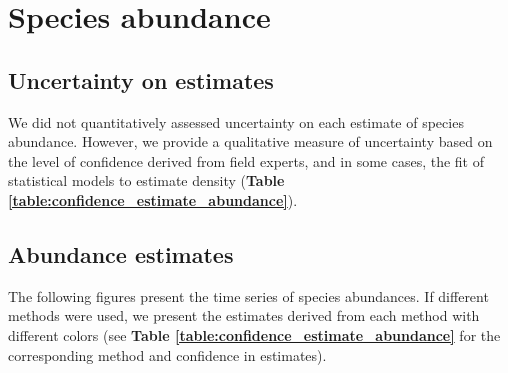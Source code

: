\documentclass[a4paper,twoside,10pt]{article}
\begin{document}
\section{Species abundance}

\subsection{Uncertainty on estimates}
We did not quantitatively assessed uncertainty on each estimate of species abundance. However, we provide a qualitative measure of uncertainty based on the level of confidence derived from field experts, and in some cases, the fit of statistical models to estimate density (\textbf{Table \ref{table:confidence_estimate_abundance}}).


\newpage

\subsection{Abundance estimates}

\newpage

The following figures present the time series of species abundances. If different methods were used, we present the estimates derived from each method with different colors (see \textbf{Table \ref{table:confidence_estimate_abundance}} for the corresponding method and confidence in estimates).
\end{document}
